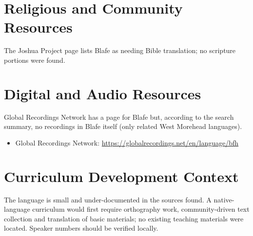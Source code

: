 \documentclass[12pt]{article}
\begin{document}
\section{Religious and Community Resources}
The Joshua Project page lists Blafe as needing Bible translation; no scripture portions were found.

\section{Digital and Audio Resources}
Global Recordings Network has a page for Blafe but, according to the search summary, no recordings in Blafe itself (only related West Morehead languages).
\begin{itemize}
\item Global Recordings Network: \url{https://globalrecordings.net/en/language/bfh}
\end{itemize}

\section{Curriculum Development Context}
The language is small and under-documented in the sources found. A native-language curriculum would first require orthography work, community-driven text collection and translation of basic materials; no existing teaching materials were located. Speaker numbers should be verified locally.
\end{document}
